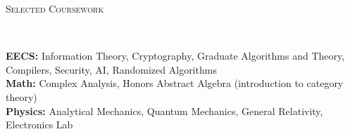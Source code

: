 \documentclass[9pt]{article}
\newenvironment{changemargin}[2]{%
  \begin{list}{}{%
      \setlength{\topsep}{0pt}%
      \setlength{\leftmargin}{#1}%
      \setlength{\rightmargin}{#2}%
      \setlength{\listparindent}{\parindent}%
      \setlength{\itemindent}{\parindent}%
      \setlength{\parsep}{\parskip}%
    }%
  \item[]}{\end{list}
}
\newcommand{\lineover}{
  \begin{changemargin}{-0.05in}{-0.05in}
    \vspace*{-8pt}
    \hrulefill \\
    \vspace*{-2pt}
  \end{changemargin}
}
\newcommand{\header}[1]{
  \begin{changemargin}{-0.5in}{-0.5in}
    \scshape{#1}\\
    \lineover
  \end{changemargin}
}
\newenvironment{body} {
  \vspace*{-16pt}
  \begin{changemargin}{-0.25in}{-0.5in}
  }
  {\end{changemargin}
}
\begin{document}
\smallskip

\header{Selected Coursework}
\begin{body}
  \vspace{14pt}
  \textbf{EECS:} Information Theory, Cryptography, Graduate Algorithms and Theory, Compilers, Security, AI, Randomized Algorithms \\
  \medskip
  \textbf{Math:} Complex Analysis, Honors Abstract Algebra (introduction to category theory) \\
  \medskip
  \textbf{Physics:} Analytical Mechanics, Quantum Mechanics, General Relativity, Electronics Lab \\
  \medskip
\end{body}
\end{document}

